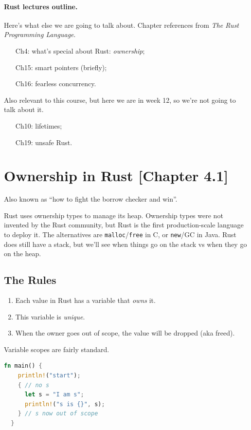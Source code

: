\documentclass[a4paper]{report}
\begin{document}
\paragraph{Rust lectures outline.} Here's what else we are going to talk about. Chapter references from
\emph{The Rust Programming Language}.
\begin{enumerate}[noitemsep]
\item[Ch4:] what's special about Rust: \emph{ownership};
\item[Ch15:] smart pointers (briefly);
\item[Ch16:] fearless concurrency.
\end{enumerate}
Also relevant to this course, but here we are in week 12, so we're not going to talk about it.
\begin{enumerate}[noitemsep]
\item[Ch10:] lifetimes;
\item[Ch19:] unsafe Rust.
\end{enumerate}

\section*{Ownership in Rust [Chapter 4.1]}
Also known as ``how to fight the borrow checker and win''.

Rust uses ownership types to manage its heap. Ownership types were not invented by the Rust
community, but Rust is the first production-scale language to deploy it. The alternatives
are {\tt malloc}/{\tt free} in C, or {\tt new}/GC in Java. Rust does still have a stack, but
we'll see when things go on the stack vs when they go on the heap.

\subsection*{The Rules}
\begin{enumerate}[noitemsep]
\item Each value in Rust has a variable that \emph{owns} it.
\item This variable is \emph{unique}.
\item When the owner goes out of scope, the value will be dropped (aka freed).
\end{enumerate}

Variable scopes are fairly standard.
\begin{lstlisting}[language=Rust]
  fn main() {
    println!("start");
    { // no s
      let s = "I am s";
      println!("s is {}", s);
    } // s now out of scope
  }
\end{lstlisting}
\end{document}

